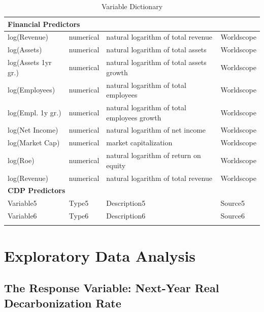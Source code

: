 \begin{longtable}{lp{2cm}p{6cm}p{2cm}}
    \midrule
    \multicolumn{4}{l}{\textbf{Financial Predictors}} \\
    \midrule
    log(Revenue) & numerical & natural logarithm of total revenue & Worldscope \\
    log(Assets) & numerical & natural logarithm of total assets & Worldscope \\
    log(Assets 1yr gr.) & numerical & natural logarithm of total assets growth & Worldscope \\
    log(Employees) & numerical & natural logarithm of total employees & Worldscope \\
    log(Empl. 1y gr.) & numerical & natural logarithm of total employees growth & Worldscope \\
    log(Net Income) & numerical & natural logarithm of net income & Worldscope \\
    log(Market Cap) & numerical & market capitalization & Worldscope \\
    log(Roe) & numerical & natural logarithm of return on equity & Worldscope \\
    log(Revenue) & numerical & natural logarithm of total revenue & Worldscope \\
    \midrule
    \multicolumn{4}{l}{\textbf{CDP Predictors}} \\
    \midrule
    Variable5 & Type5 & Description5 & Source5 \\
    Variable6 & Type6 & Description6 & Source6 \\
    
    \bottomrule
\caption{Variable Dictionary}
\label{tab:variable-dictionary}
\end{longtable}

\section{Exploratory Data Analysis}

\subsection{The Response Variable: Next-Year Real Decarbonization Rate}

